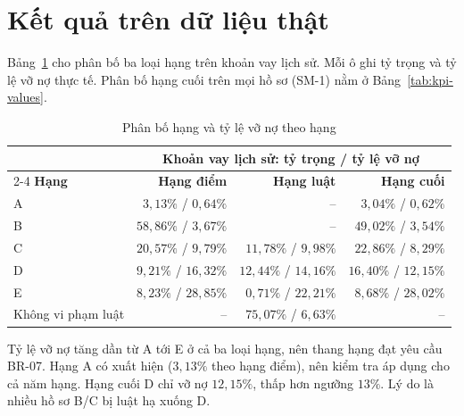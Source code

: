 \section{Kết quả trên dữ liệu thật}
\label{sec:dss-results}

Bảng~\ref{tab:grade-distribution} cho phân bố ba loại hạng trên khoản vay lịch sử. Mỗi ô ghi tỷ trọng và tỷ lệ vỡ nợ thực tế. Phân bố hạng cuối trên mọi hồ sơ (SM-1) nằm ở Bảng~\ref{tab:kpi-values}.

\begin{table}[H]
	\centering
	\caption{Phân bố hạng và tỷ lệ vỡ nợ theo hạng}
	\label{tab:grade-distribution}
	\footnotesize
	\begin{tabular}{l r r r}
		\toprule
		                   & \multicolumn{3}{c}{\textbf{Khoản vay lịch sử: tỷ trọng / tỷ lệ vỡ nợ}}                                                         \\
		\cmidrule(lr){2-4}
		\textbf{Hạng}      & \textbf{Hạng điểm}                                                     & \textbf{Hạng luật}        & \textbf{Hạng cuối}        \\
		\midrule
		A                  & $3{,}13\%$ / $0{,}64\%$                                                & --                        & $3{,}04\%$ / $0{,}62\%$   \\
		B                  & $58{,}86\%$ / $3{,}67\%$                                               & --                        & $49{,}02\%$ / $3{,}54\%$  \\
		C                  & $20{,}57\%$ / $9{,}79\%$                                               & $11{,}78\%$ / $9{,}98\%$  & $22{,}86\%$ / $8{,}29\%$  \\
		D                  & $9{,}21\%$ / $16{,}32\%$                                               & $12{,}44\%$ / $14{,}16\%$ & $16{,}40\%$ / $12{,}15\%$ \\
		E                  & $8{,}23\%$ / $28{,}85\%$                                               & $0{,}71\%$ / $22{,}21\%$  & $8{,}68\%$ / $28{,}02\%$  \\
		Không vi phạm luật & --                                                                     & $75{,}07\%$ / $6{,}63\%$  & --                        \\
		\bottomrule
	\end{tabular}
\end{table}

Tỷ lệ vỡ nợ tăng dần từ A tới E ở cả ba loại hạng, nên thang hạng đạt yêu cầu BR-07. Hạng A có xuất hiện ($3{,}13\%$ theo hạng điểm), nên kiểm tra áp dụng cho cả năm hạng. Hạng cuối D chỉ vỡ nợ $12{,}15\%$, thấp hơn ngưỡng $13\%$. Lý do là nhiều hồ sơ B/C bị luật hạ xuống D.

